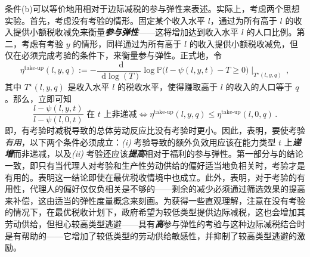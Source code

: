 \documentclass[12pt,letterpaper]{article}
\newenvironment{translation}{\color{blue}\noindent}{}
\theoremstyle{plain}
\theoremstyle{definition}
\theoremstyle{remark}
\renewcommand{\P}{\mathds{P}}
\renewcommand{\1}{\mathds{1}}
\renewcommand*\d{\mathop{}\!\mathrm{d}}
\theoremstyle{definition}
\begin{document}
\begin{translation}
条件(b)可以等价地用相对于边际减税的参与弹性来表述。实际上，考虑两个思想实验。首先，考虑没有考验的情形。固定某个收入水平 $l$，通过为所有高于 $l$ 的收入提供小额税收减免来衡量\textit{\textbf{参与弹性}}——这将增加达到收入水平 $l$ 的人口比例。第二，考虑有考验 $y$ 的情形，同样通过为所有高于 $l$ 的收入提供小额税收减免，但仅在必须完成考验的条件下，来衡量参与弹性。正式地，令
\[\eta^{\text{take-up}}(l, y, q) := - \frac{\d}{\d  \log(T)} \log \P\Big(l -\psi(l, y, t) - T \geq 0\Big) \mid_{T^\star(l, y, q)} \,,\]
其中 $T^\star(l, y, q)$ 是收入水平 $l$ 的税收水平，使得赚取高于 $l$ 的收入的人口等于 $q$。那么，立即可知
\[\frac{l - \psi(l, y, t)}{l - \psi(l, 0, t)} \text{ 在 $t$ 上非递减} \iff \eta^{\text{take-up}}(l, y, q) \leq \eta^{\text{take-up}}(l, 0, q)\,. \]
即，有考验时减税导致的总体劳动反应比没有考验时更小。因此，表明，要使考验\textit{有用}，以下两个条件必须成立：\textit{(i)} 考验导致的额外负效用应该在能力类型 $t$ 上\textit{\textbf{递增}}而非递减，以及\textit{(ii)} 考验还应该\textit{\textbf{提高}}相对于福利的参与弹性。第一部分与\citet{yang2022costly}的结论一致，即只有当代理人对考验和生产性劳动供给的偏好适当地负相关时，考验才是有用的。表明这一结论即使在最优税收情境中也成立。此外，表明，对于考验的有用性，代理人的偏好仅仅负相关是不够的——剩余的减少必须通过筛选效果的提高来补偿，这由适当的弹性度量概念来刻画。为获得一些直观理解，注意在没有考验的情况下，在最优税收计划下，政府希望为较低类型提供边际减税，这也会增加其劳动供给，但担心较高类型逃避——具有\textit{\textbf{高}}参与弹性的考验与这种边际减税结合时是有帮助的——它增加了较低类型的劳动供给敏感性，并抑制了较高类型逃避的激励。
\end{translation}
\end{document}
